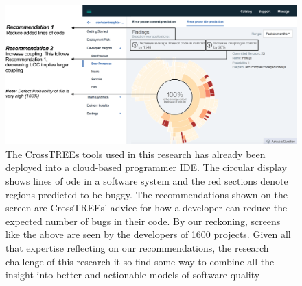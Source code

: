 \begin{figure} 
    \centering
    \includegraphics[width=\linewidth]{figs/bluemix.png}
    \caption{The CrossTREEs tools used in this research has already been deployed into
   a cloud-based programmer IDE. The circular display shows lines of ode in a software system
    and the red sections denote regions predicted to be buggy. The recommendations shown on the screen are CrossTREEs' advice
    for how a developer can reduce the expected number of bugs
    in their code. By our reckoning, screens like the above are seen
    by the developers of 1600 projects. Given all that expertise reflecting on our recommendations, the research challenge of this research it so find some way to combine all the insight into better and actionable models of
    software quality
}
    \label{fig:bluemix}
\end{figure}